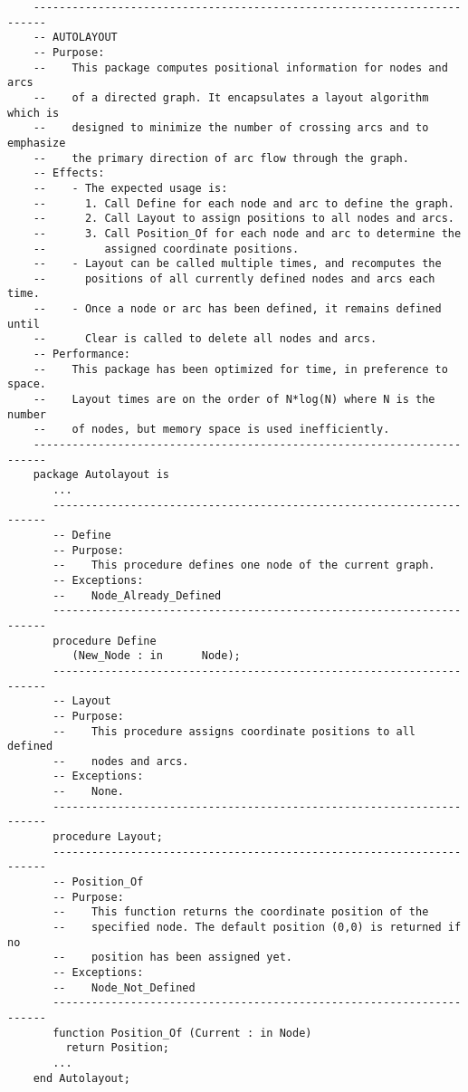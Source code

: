 \begin{lstlisting}
    ------------------------------------------------------------------------
    -- AUTOLAYOUT
    -- Purpose:
    --    This package computes positional information for nodes and arcs
    --    of a directed graph. It encapsulates a layout algorithm which is
    --    designed to minimize the number of crossing arcs and to emphasize
    --    the primary direction of arc flow through the graph.
    -- Effects:
    --    - The expected usage is:
    --      1. Call Define for each node and arc to define the graph.
    --      2. Call Layout to assign positions to all nodes and arcs.
    --      3. Call Position_Of for each node and arc to determine the
    --         assigned coordinate positions.
    --    - Layout can be called multiple times, and recomputes the
    --      positions of all currently defined nodes and arcs each time.
    --    - Once a node or arc has been defined, it remains defined until
    --      Clear is called to delete all nodes and arcs.
    -- Performance:
    --    This package has been optimized for time, in preference to space.
    --    Layout times are on the order of N*log(N) where N is the number
    --    of nodes, but memory space is used inefficiently.
    ------------------------------------------------------------------------
    package Autolayout is
       ...
       ---------------------------------------------------------------------
       -- Define
       -- Purpose:
       --    This procedure defines one node of the current graph.
       -- Exceptions:
       --    Node_Already_Defined
       ---------------------------------------------------------------------
       procedure Define
	      (New_Node : in      Node);
       ---------------------------------------------------------------------
       -- Layout
       -- Purpose:
       --    This procedure assigns coordinate positions to all defined
       --    nodes and arcs.
       -- Exceptions:
       --    None.
       ---------------------------------------------------------------------
       procedure Layout;
       ---------------------------------------------------------------------
       -- Position_Of
       -- Purpose:
       --    This function returns the coordinate position of the
       --    specified node. The default position (0,0) is returned if no
       --    position has been assigned yet.
       -- Exceptions:
       --    Node_Not_Defined
       ---------------------------------------------------------------------
       function Position_Of (Current : in Node)
	     return Position;
       ...
    end Autolayout;
\end{lstlisting}

